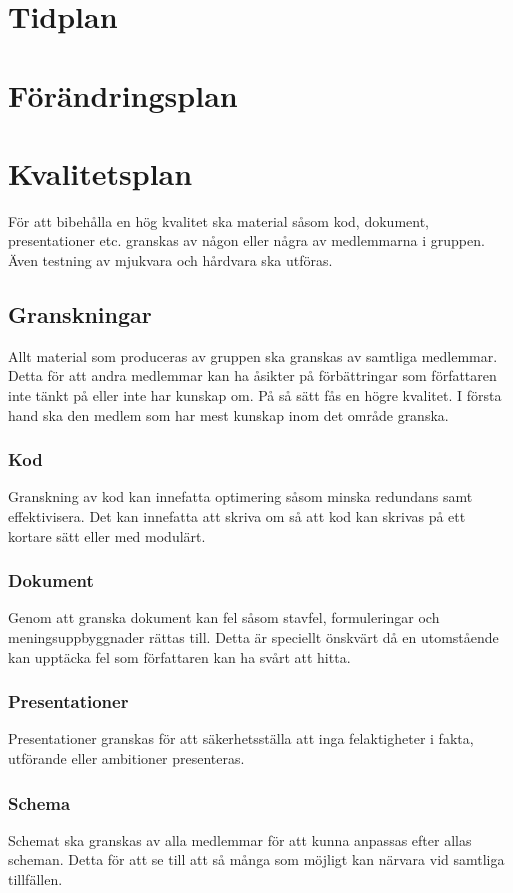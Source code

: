 \documentclass[projektplan/plan.tex]{subfiles}
\begin{document}
\section{Tidplan}

\section{Förändringsplan}

\section{Kvalitetsplan}
För att bibehålla en hög kvalitet ska material såsom kod, dokument, presentationer etc. granskas av någon eller några av medlemmarna i gruppen.
Även testning av mjukvara och hårdvara ska utföras.

\subsection{Granskningar}
Allt material som produceras av gruppen ska granskas av samtliga medlemmar. Detta för att andra medlemmar kan ha åsikter på förbättringar som författaren inte tänkt på eller inte har kunskap om. På så sätt fås en högre kvalitet. I första hand ska den medlem som har mest kunskap inom det område granska.

\subsubsection{Kod}	
Granskning av kod kan innefatta optimering såsom minska redundans samt effektivisera. Det kan innefatta att skriva om så att kod kan skrivas på ett kortare sätt eller med modulärt.

\subsubsection{Dokument}	
Genom att granska dokument kan fel såsom stavfel, formuleringar och meningsuppbyggnader rättas till. Detta är speciellt önskvärt då en utomstående kan upptäcka fel som författaren kan ha svårt att hitta.

\subsubsection{Presentationer}	
Presentationer granskas för att säkerhetsställa att inga felaktigheter i fakta, utförande eller ambitioner presenteras.

\subsubsection{Schema}	
Schemat ska granskas av alla medlemmar för att kunna anpassas efter allas scheman. Detta för att se till att så många som möjligt kan närvara vid samtliga tillfällen. 
\end{document}

